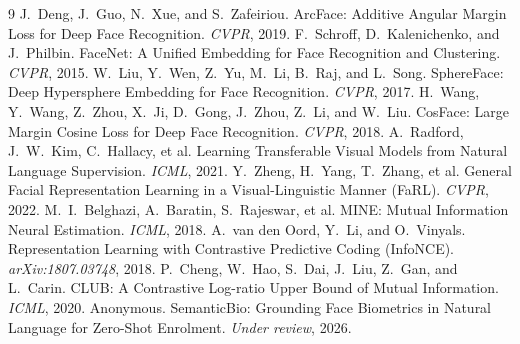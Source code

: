 \documentclass[10pt,twocolumn,letterpaper]{article}
\begin{document}
\begin{thebibliography}{9}\small
{} J.~Deng, J.~Guo, N.~Xue, and S.~Zafeiriou.
  ArcFace: Additive Angular Margin Loss for Deep Face Recognition. \emph{CVPR}, 2019.
 F.~Schroff, D.~Kalenichenko, and J.~Philbin.
  FaceNet: A Unified Embedding for Face Recognition and Clustering. \emph{CVPR}, 2015.
 W.~Liu, Y.~Wen, Z.~Yu, M.~Li, B.~Raj, and L.~Song.
  SphereFace: Deep Hypersphere Embedding for Face Recognition. \emph{CVPR}, 2017.
 H.~Wang, Y.~Wang, Z.~Zhou, X.~Ji, D.~Gong, J.~Zhou, Z.~Li, and W.~Liu.
  CosFace: Large Margin Cosine Loss for Deep Face Recognition. \emph{CVPR}, 2018.
 A.~Radford, J.~W.~Kim, C.~Hallacy, et al.
  Learning Transferable Visual Models from Natural Language Supervision. \emph{ICML}, 2021.
 Y.~Zheng, H.~Yang, T.~Zhang, et al.
  General Facial Representation Learning in a Visual-Linguistic Manner (FaRL). \emph{CVPR}, 2022.
 M.~I.~Belghazi, A.~Baratin, S.~Rajeswar, et al.
  MINE: Mutual Information Neural Estimation. \emph{ICML}, 2018.
 A.~van den Oord, Y.~Li, and O.~Vinyals.
  Representation Learning with Contrastive Predictive Coding (InfoNCE). \emph{arXiv:1807.03748}, 2018.
 P.~Cheng, W.~Hao, S.~Dai, J.~Liu, Z.~Gan, and L.~Carin.
  CLUB: A Contrastive Log-ratio Upper Bound of Mutual Information. \emph{ICML}, 2020.
 Anonymous.
  SemanticBio: Grounding Face Biometrics in Natural Language for Zero-Shot Enrolment.
  \emph{Under review}, 2026.
\end{thebibliography}
\end{document}
